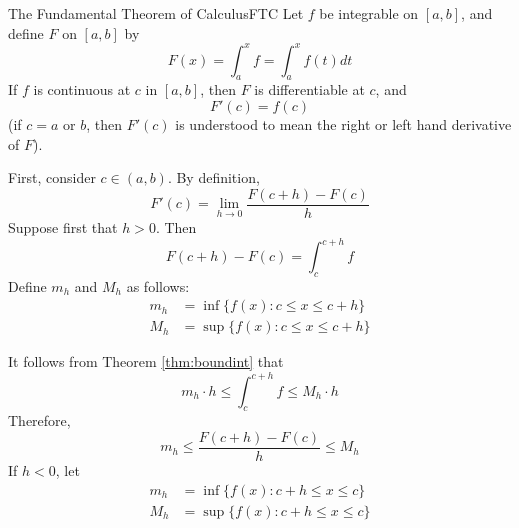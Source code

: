 \documentclass[12pt]{report}
\begin{document}
\begin{namthm}{The Fundamental Theorem of Calculus}{FTC}
    Let $f$ be integrable on $[a,b]$, and define $F$ on $[a,b]$ by \begin{equation}
        F(x) = \int_a^xf = \int_a^xf(t)dt
    \end{equation}
    If $f$ is continuous at $c$ in $[a,b]$, then $F$ is differentiable at $c$, and \begin{equation}
        F'(c) = f(c)
    \end{equation}
    (if $c = a$ or $b$, then $F'(c)$ is understood to mean the right or left hand derivative of $F$).
\end{namthm}
\begin{proof*}{}{}
    First, consider $c \in (a,b)$. By definition,\begin{equation*}
        F'(c) = \lim\limits_{h\rightarrow 0}\frac{F(c+h)-F(c)}{h}
    \end{equation*}
    Suppose first that $h > 0$. Then \begin{equation*}
        F(c+h) - F(c) = \int_c^{c+h}f
    \end{equation*}
    Define $m_h$ and $M_h$ as follows:\begin{align*}
        m_h &= \inf\{f(x):c\leq x \leq c+h\} \\
        M_h &= \sup\{f(x):c\leq x \leq c+h\}
    \end{align*}

    It follows from Theorem \ref{thm:boundint} that \begin{equation*}
        m_h\cdot h\leq \int_c^{c+h}f \leq M_h\cdot h
    \end{equation*}
    Therefore, \begin{equation*}
        m_h\leq \frac{F(c+h) - F(c)}{h} \leq M_h
    \end{equation*}
    If $h < 0$, let \begin{align*}
        m_h &= \inf\{f(x):c+h\leq x \leq c\} \\
        M_h &= \sup\{f(x):c+h\leq x \leq c\}
    \end{align*}


\end{proof*}
\end{document}
